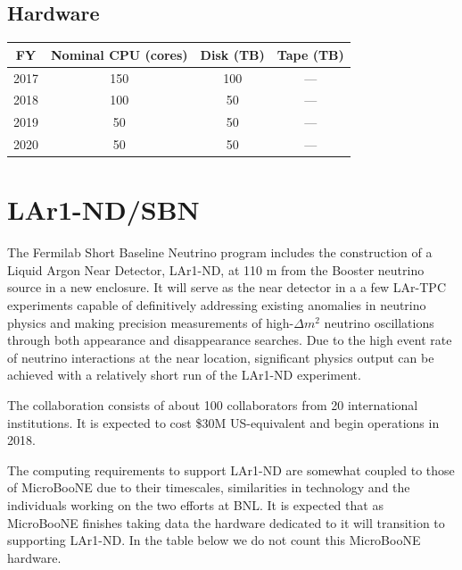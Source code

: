 \documentclass[pdftex,12pt,letter]{article}
\begin{document}
\subsection{Hardware}


\begin{table}[tbh]
\centering
\begin{tabular}{|c|c|c|c|}
\hline
FY & Nominal CPU (cores) & Disk (TB) & Tape (TB) \\
\hline
2017 &  150 & 100  & ---  \\
\hline
2018 &  100 & 50  & --- \\
\hline
2019  &  50 & 50 & ---  \\
\hline
2020 &  50  & 50 & --- \\
\hline
\end{tabular}
\end{table}

\pagebreak
\section{LAr1-ND/SBN}



The Fermilab Short Baseline Neutrino program includes the construction
of a Liquid Argon Near Detector, LAr1-ND, at 110 m from the Booster
neutrino source in a new enclosure.
It will serve as the near detector in a a few LAr-TPC experiments
capable of definitively addressing existing anomalies in neutrino
physics and making precision measurements of high-$\Delta m^2$
neutrino oscillations through both appearance and disappearance
searches.
Due to the high event rate of neutrino interactions at the near
location, significant physics output can be achieved with a relatively
short run of the LAr1-ND experiment.  

The collaboration consists of about 100 collaborators from 20
international institutions.
It is expected to cost \$30M US-equivalent and begin operations in
2018. 

The computing requirements to support LAr1-ND are somewhat coupled to
those of MicroBooNE due to their timescales, similarities in
technology and the individuals working on the two efforts at BNL.
It is expected that as MicroBooNE finishes taking data the hardware
dedicated to it will transition to supporting LAr1-ND.
In the table below we do not count this MicroBooNE hardware.
\end{document}
